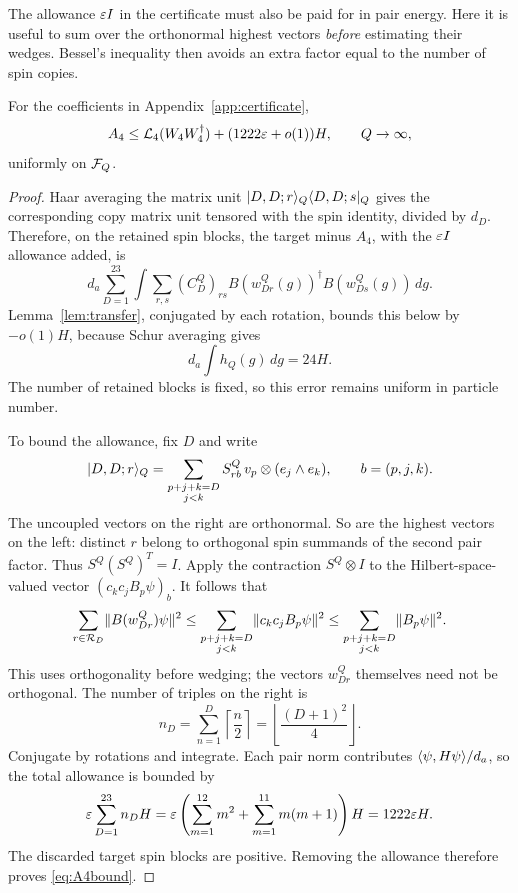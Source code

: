 The allowance $\varepsilon I$ in the certificate must also be paid for in pair
energy.  Here it is useful to sum over the orthonormal highest vectors
\emph{before} estimating their wedges.  Bessel's inequality then avoids
an extra factor equal to the number of spin copies.

\begin{proposition}\label{prop:A4}
For the coefficients in Appendix~\ref{app:certificate},
\begin{equation}\label{eq:A4bound}
 A_4\le\mathcal L_4(W_4W_4^\dagger)+(1222\varepsilon+o(1))H,
 \qquad Q\to\infty,
\end{equation}
uniformly on $\mathcal F_Q$.
\end{proposition}
\begin{proof}
Haar averaging the matrix unit
$\lvert D,D;r\rangle_Q\langle D,D;s\rvert_Q$ gives the corresponding copy matrix unit
tensored with the spin identity, divided by $d_D$.  Therefore, on the
retained spin blocks, the target minus $A_4$, with the $\varepsilon I$ allowance
added, is
\[
 d_a\sum_{D=1}^{23}\int\sum_{r,s}(C_D^Q)_{rs}
 B(w_{Dr}^Q(g))^\dagger B(w_{Ds}^Q(g))\,dg.
\]
Lemma~\ref{lem:transfer}, conjugated by each rotation, bounds this below
by $-o(1)H$, because Schur averaging gives
\[
 d_a\int h_Q(g)\,dg=24H.
\]
The number of retained blocks is fixed, so this error remains uniform
in particle number.

To bound the allowance, fix $D$ and write
\[
 \lvert D,D;r\rangle_Q
   =\sum_{\substack{p+j+k=D\\j<k}}S_{rb}^Q\,
                     v_p\otimes(e_j\wedge e_k),
 \qquad b=(p,j,k).
\]
The uncoupled vectors on the right are orthonormal.  So are the highest
vectors on the left: distinct $r$ belong to orthogonal spin summands of
the second pair factor.  Thus $S^Q(S^Q)^T=I$.  Apply the contraction
$S^Q\otimes I$ to the Hilbert-space-valued vector
$(c_kc_jB_p\psi)_b$.  It follows that
\[
 \sum_{r\in\mathcal R_D}\lVert B(w_{Dr}^Q)\psi\rVert^2
 \le\sum_{\substack{p+j+k=D\\j<k}}\lVert c_kc_jB_p\psi\rVert^2
 \le\sum_{\substack{p+j+k=D\\j<k}}\lVert B_p\psi\rVert^2.
\]
This uses orthogonality before wedging; the vectors $w_{Dr}^Q$ themselves
need not be orthogonal.  The number of triples on the right is
\[
 n_D=\sum_{n=1}^D\left\lceil\frac n2\right\rceil
     =\left\lfloor\frac{(D+1)^2}{4}\right\rfloor.
\]
Conjugate by rotations and integrate.  Each pair norm contributes
$\langle \psi,H\psi\rangle/d_a$, so the total allowance is bounded by
\[
 \varepsilon\sum_{D=1}^{23}n_DH
 =\varepsilon\left(\sum_{m=1}^{12}m^2+
                 \sum_{m=1}^{11}m(m+1)\right)H
 =1222\varepsilon H.
\]
The discarded target spin blocks are positive.  Removing the allowance
therefore proves \eqref{eq:A4bound}.
\end{proof}
